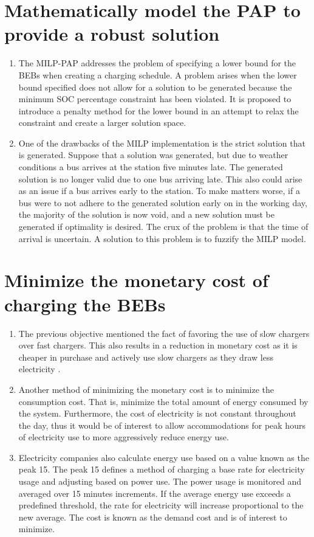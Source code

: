 \documentclass[ee,msthesis]{usuthesis}
\begin{document}
\section{Mathematically model the PAP to provide a robust solution}
\label{sec:obj-math-model-robust}
\begin{enumerate}
\item The MILP-PAP addresses the problem of specifying a lower bound for the BEBs when creating a charging schedule. A
problem arises when the lower bound specified does not allow for a solution to be generated because the minimum SOC
percentage constraint has been violated. It is proposed to introduce a penalty method for the lower bound in an
attempt to relax the constraint and create a larger solution space.

\item One of the drawbacks of the MILP implementation is the strict solution that is generated. Suppose that a solution was
generated, but due to weather conditions a bus arrives at the station five minutes late. The generated solution is no
longer valid due to one bus arriving late. This also could arise as an issue if a bus arrives early to the station.
To make matters worse, if a bus were to not adhere to the generated solution early on in the working day, the
majority of the solution is now void, and a new solution must be generated if optimality is desired. The crux of the
problem is that the time of arrival is uncertain. A solution to this problem is to fuzzify the MILP model.
\end{enumerate}

\section{Minimize the monetary cost of charging the BEBs}
\label{sec:org53d9b22}

\begin{enumerate}
\item The previous objective mentioned the fact of favoring the use of slow chargers over fast chargers. This also results
in a reduction in monetary cost as it is cheaper in purchase and actively use slow chargers as they draw less
electricity \cite{he-2020-optim-charg}.

\item Another method of minimizing the monetary cost is to minimize the consumption cost. That is, minimize the total
amount of energy consumed by the system. Furthermore, the cost of electricity is not constant throughout the day,
thus it would be of interest to allow accommodations for peak hours of electricity use to more aggressively reduce
energy use.

\item Electricity companies also calculate energy use based on a value known as the peak 15. The peak 15 defines a method
of charging a base rate for electricity usage and adjusting based on power use. The power usage is monitored and averaged
over 15 minutes increments. If the average energy use exceeds a predefined threshold, the rate for electricity will
increase proportional to the new average. The cost is known as the demand cost and is of interest to minimize.
\end{enumerate}
\end{document}
